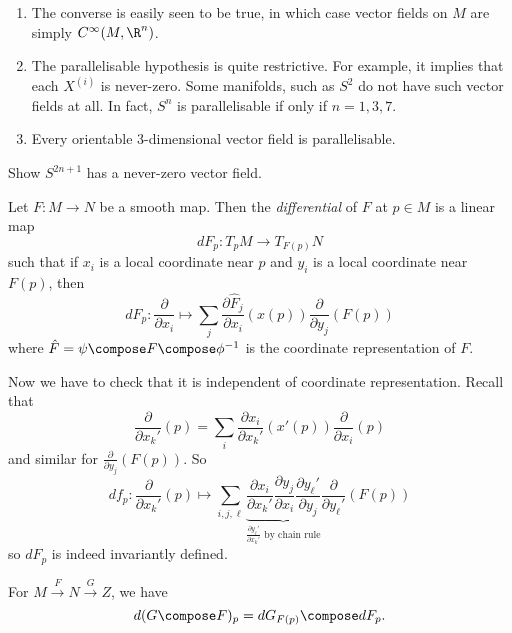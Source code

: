 \documentclass[a4paper]{article}
\begin{document}
\begin{remark}\leavevmode
  \begin{enumerate}
  \item The converse is easily seen to be true, in which case vector fields on \(M\) are simply \(C^\infty(M, \R^n)\).
  \item The parallelisable hypothesis is quite restrictive. For example, it implies that each \(X^{(i)}\) is never-zero. Some manifolds, such as \(S^2\) do not have such vector fields at all. In fact, \(S^n\) is parallelisable if only if \(n = 1, 3, 7\).
  \item Every orientable \(3\)-dimensional vector field is parallelisable.
  \end{enumerate}
\end{remark}

\begin{ex}
  Show \(S^{2n + 1}\) has a never-zero vector field.
\end{ex}

\begin{definition}[differential]
  Let \(F: M \to N\) be a smooth map. Then the \emph{differential} of \(F\) at \(p \in M\) is a linear map
  \[
    dF_p: T_pM \to T_{F(p)}N
  \]
  such that if \(x_i\) is a local coordinate near \(p\) and \(y_i\) is a local coordinate near \(F(p)\), then
  \[
    dF_p : \frac{\partial  }{\partial x_i} \mapsto \sum_j \frac{\partial \hat F_j}{\partial x_i}(x(p)) \frac{\partial  }{\partial y_j} (F(p))
  \]
  where \(\hat F = \psi \compose F \compose \phi^{-1}\) is the coordinate representation of \(F\).
\end{definition}

Now we have to check that it is independent of coordinate representation. Recall that
\[
  \frac{\partial  }{\partial x_k'}(p) = \sum_i \frac{\partial x_i}{\partial x_k'}(x'(p)) \frac{\partial  }{\partial x_i}(p)
\]
and similar for \(\frac{\partial  }{\partial y_j}(F(p))\). So
\[
  df_p: \frac{\partial  }{\partial x_k'}(p) \mapsto \sum_{i, j, \ell} \underbrace{\frac{\partial x_i}{\partial x_k'} \frac{\partial y_j}{\partial x_i} \frac{\partial y_\ell'}{\partial y_j}}_{\frac{\partial y_\ell'}{\partial x_k'} \text{ by chain rule}} \frac{\partial  }{\partial y_\ell'} (F(p))
\]
so \(dF_p\) is indeed invariantly defined.

\begin{ex}
  For \(M \xrightarrow{F} N \xrightarrow{G} Z\), we have
  \[
    d(G \compose F)_p = dG_{F(p)} \compose dF_p.
  \]
\end{ex}
\end{document}
